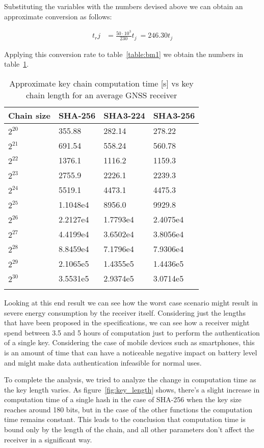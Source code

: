 Substituting the variables with the numbers devised above we can obtain an
approximate conversion as follows:

\begin{equation}
  \label{eq:mips_conv}
  \begin{aligned}
  t_rj &= \frac{50 \cdot 10^3}{230} t_j\
        = 246.30 t_j
  \end{aligned}
\end{equation}

Applying this conversion rate to table~\ref{table:bm1} we obtain the numbers in
table~\ref{table:bm1_recv}.

\begin{longtable}[]{@{}llll@{}}
\toprule
Chain size & SHA-256 & SHA3-224 & SHA3-256\tabularnewline
\midrule
\endhead
$2^{20}$ & 355.88 & 282.14 & 278.22\tabularnewline
$2^{21}$ & 691.54 & 558.24 & 560.78\tabularnewline
$2^{22}$ & 1376.1 & 1116.2 & 1159.3\tabularnewline
$2^{23}$ & 2755.9 & 2226.1 & 2239.3\tabularnewline
$2^{24}$ & 5519.1 & 4473.1 & 4475.3\tabularnewline
$2^{25}$ & 1.1048e4 & 8956.0 & 9929.8\tabularnewline
$2^{26}$ & 2.2127e4 & 1.7793e4 & 2.4075e4\tabularnewline
$2^{27}$ & 4.4199e4 & 3.6502e4 & 3.8056e4\tabularnewline
$2^{28}$ & 8.8459e4 & 7.1796e4 & 7.9306e4\tabularnewline
$2^{29}$ & 2.1065e5 & 1.4355e5 & 1.4436e5\tabularnewline
$2^{30}$ & 3.5531e5 & 2.9374e5 & 3.0714e5\tabularnewline
\bottomrule
\caption{Approximate key chain computation time [s] vs key chain length for an
average GNSS receiver}
\label{table:bm1_recv}
\end{longtable}

Looking at this end result we can see how the worst case scenario might result
in severe energy consumption by the receiver itself. Considering just the
lengths that have been proposed in the specifications, we can see how a receiver
might spend between 3.5 and 5 hours of computation just to perform the
authentication of a single key. Considering the case of mobile devices such as
smartphones, this is an amount of time that can have a noticeable negative
impact on battery level and might make data authentication infeasible for normal
uses.

To complete the analysis, we tried to analyze the change in computation time as
the key length varies. As figure~\ref{fig:key_length} shows, there's a slight
increase in computation time of a single hash in the case of SHA-256 when the
key size reaches around 180 bits, but in the case of the other functions the
computation time remains constant. This leads to the conclusion that computation
time is bound only by the length of the chain, and all other parameters don't
affect the receiver in a significant way.

